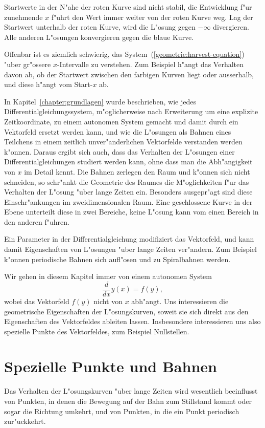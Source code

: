 Startwerte in der N"ahe der roten Kurve sind nicht stabil,
die Entwicklung f"ur zunehmende $x$ f"uhrt den Wert immer weiter von
der roten Kurve weg.
Lag der Startwert unterhalb der roten Kurve, wird die L"osung gegen
$-\infty$ divergieren.
Alle anderen L"osungen konvergieren gegen die blaue Kurve.

Offenbar ist es ziemlich schwierig, das
System~(\ref{geometrie:harvest-equation}) "uber gr"ossere $x$-Intervalle
zu verstehen. 
Zum Beispiel h"angt das Verhalten davon ab, ob der Startwert zwischen den
farbigen Kurven liegt oder ausserhalb, und diese h"angt vom Start-$x$ ab.

In Kapitel~\ref{chapter:grundlagen} wurde beschrieben, wie jedes
Differentialgleichungssystem, m"oglicherweise nach Erweiterung um eine
explizite Zeitkoordinate, zu einem autonomen System gemacht und damit
durch ein Vektorfeld ersetzt werden kann,
und wie die L"osungen als Bahnen eines Teilchens in einem zeitlich
unver"anderlichen Vektorfelde verstanden werden k"onnen.
Daraus ergibt sich auch, dass das Verhalten der L"osungen einer
Differentialgleichungen studiert werden kann, ohne dass man
die Abh"angigkeit von $x$ im Detail kennt.
Die Bahnen zerlegen den Raum und k"onnen sich nicht schneiden,
so schr"ankt die Geometrie des Raumes die M"oglichkeiten f"ur das
Verhalten der L"osung "uber lange Zeiten ein.
Besonders ausgepr"agt sind diese Einschr"ankungen im zweidimensionalen
Raum.
Eine geschlossene Kurve in der Ebene unterteilt diese in zwei Bereiche,
keine L"osung kann vom einen Bereich in den anderen f"uhren.

Ein Parameter in der Differentialgleichung modifiziert das Vektorfeld,
und kann damit Eigenschaften von L"osungen "uber lange Zeiten ver"andern.
Zum Beispiel k"onnen periodische Bahnen sich aufl"osen und zu Spiralbahnen
werden.

Wir gehen in diesem Kapitel immer von einem autonomen System
\[
\frac{d}{dx}y(x)=f(y),
\]
wobei das Vektorfeld $f(y)$ nicht von $x$ abh"angt.
Uns interessieren die geometrische Eigenschaften der L"osungskurven, 
soweit sie sich direkt aus den Eigenschaften des Vektorfeldes ableiten
lassen.
Insbesondere interessieren uns also spezielle Punkte des Vektorfeldes,
zum Beispiel Nullstellen.


%
%
\section{Spezielle Punkte und Bahnen}
Das Verhalten der L"osungskurven "uber lange Zeiten wird wesentlich
beeinflusst von Punkten, in denen die Bewegung auf der Bahn
zum Stillstand kommt oder sogar die Richtung umkehrt, und von Punkten,
in die ein Punkt periodisch zur"uckkehrt.


